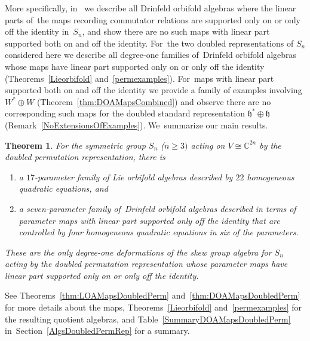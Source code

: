 \documentclass[pdftex]{sigma}
\numberwithin{equation}{section}
\newtheorem{Theorem}{Theorem}[section]
\begin{document}
More specifically, in~\cite{FGK} we describe all Drinfeld orbifold algebras
where the linear parts of~the maps recording commutator relations are supported only
on or only off the identity in~$S_n$, and show there are no such maps with
linear part supported both on and off the identity. For~the two
doubled representations of $S_n$ considered here we describe all degree-one
families of~Drinfeld orbifold algebras whose maps have linear part supported only on
or only off the identity (Theorems~\ref{Lieorbifold} and~\ref{permexamples}). For~maps with linear part supported both on and off the identity
we provide a family of examples involving $W^*\oplus W$
(Theorem~\ref{thm:DOAMapsCombined})
and observe there are no corresponding such maps for
the doubled standard representation $\mathfrak{h}^*\oplus \mathfrak{h}$
(Remark~\ref{NoExtensionsOfExamples}). We~summarize our main results.
\begin{Theorem}\label{thA}
For the symmetric group $S_n$ ($n\geq 3)$ acting on $V \cong \mathbb{C}^{2n}$
by the doubled permutation representation, there is
\begin{enumerate}\itemsep=0pt
\item[$(1)$] a $17$-parameter family of Lie orbifold algebras described by $22$
homogeneous quadratic equations, and
\item[$(2)$] a seven-parameter family of~Drinfeld orbifold algebras described in terms
of parameter maps with linear part supported only off the identity that are
controlled by four homogeneous quadratic equations in six of the parameters.
\end{enumerate}
These are the only degree-one deformations of the skew group algebra for $S_n$
acting by the doubled permutation representation whose
parameter maps have linear part supported only on or only off the identity.
\end{Theorem}
See Theorems~\ref{thm:LOAMapsDoubledPerm} and~\ref{thm:DOAMapsDoubledPerm}
for more details about the maps, Theorems~\ref{Lieorbifold} and~\ref{permexamples}
for the resulting quotient algebras, and Table~\ref{SummaryDOAMapsDoubledPerm}
in~Section~\ref{AlgsDoubledPermRep} for a summary.
\end{document}
